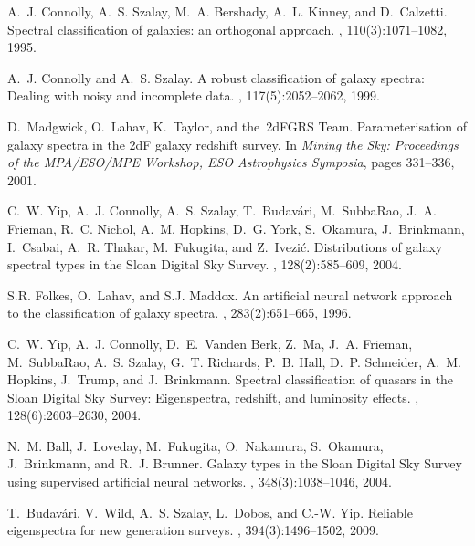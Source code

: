 \documentclass[twoside]{article}
\begin{document}
\begin{small}
\begin{thebibliography}{100}
A.~J. Connolly, A.~S. Szalay, M.~A. Bershady, A.~L. Kinney, and D.~Calzetti.
\newblock Spectral classification of galaxies: an orthogonal approach.
, 110(3):1071--1082, 1995.

A.~J. Connolly and A.~S. Szalay.
\newblock A robust classification of galaxy spectra: Dealing with noisy and
  incomplete data.
, 117(5):2052--2062, 1999.

D.~Madgwick, O.~Lahav, K.~Taylor, and the~2dFGRS Team.
\newblock Parameterisation of galaxy spectra in the 2d{F} galaxy redshift
  survey.
\newblock In {\em Mining the Sky: Proceedings of the MPA/ESO/MPE Workshop, ESO
  Astrophysics Symposia}, pages 331--336, 2001.

C.~W. Yip, A.~J. Connolly, A.~S. Szalay, T.~Budav\'{a}ri, M.~SubbaRao, J.~A.
  Frieman, R.~C. Nichol, A.~M. Hopkins, D.~G. York, S.~Okamura, J.~Brinkmann,
  I.~Csabai, A.~R. Thakar, M.~Fukugita, and Z.~Ivezi\'{c}.
\newblock Distributions of galaxy spectral types in the {S}loan {D}igital {S}ky
  {S}urvey.
, 128(2):585--609, 2004.

S.R. Folkes, O.~Lahav, and S.J. Maddox.
\newblock An artificial neural network approach to the classification of galaxy
  spectra.
, 283(2):651--665, 1996.

C.~W. Yip, A.~J. Connolly, D.~E.~Vanden Berk, Z.~Ma, J.~A. Frieman,
  M.~SubbaRao, A.~S. Szalay, G.~T. Richards, P.~B. Hall, D.~P. Schneider, A.~M.
  Hopkins, J.~Trump, and J.~Brinkmann.
\newblock Spectral classification of quasars in the {S}loan {D}igital {S}ky
  {S}urvey: Eigenspectra, redshift, and luminosity effects.
, 128(6):2603--2630, 2004.

N.~M. Ball, J.~Loveday, M.~Fukugita, O.~Nakamura, S.~Okamura, J.~Brinkmann, and
  R.~J. Brunner.
\newblock Galaxy types in the {S}loan {D}igital {S}ky {S}urvey using supervised
  artificial neural networks.
,
  348(3):1038--1046, 2004.

T.~Budav\'{a}ri, V.~Wild, A.~S. Szalay, L.~Dobos, and C.-W. Yip.
\newblock Reliable eigenspectra for new generation surveys.
,
  394(3):1496--1502, 2009.


\end{thebibliography}
\end{small}
\end{document}
